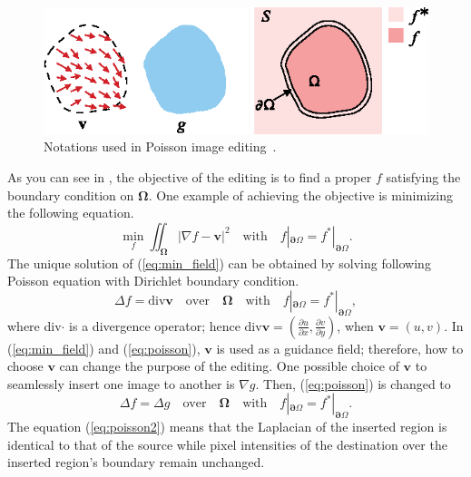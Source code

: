 \documentclass[11pt]{hyu_thesis}
\begin{document}
\begin{figure}
	\centering
	\includegraphics[width=0.9\linewidth]{poisson_image_editing_notation.eps}
	\caption{Notations used in Poisson image editing~\cite{Perez2003}.}
	\label{fig:poisson_notation}
\end{figure}
As you can see in , the objective of the editing is to find a proper $f$ satisfying the boundary condition on $\boldsymbol\Omega$. One example of achieving the objective is minimizing the following equation.
\begin{equation}
\label{eq:min_field}
\min_f \iint_{\boldsymbol\Omega} |\nabla f - \textbf{v}|^2 \quad \textrm{with} \quad f|_{\boldsymbol\partial\Omega}=f^{*}|_{\boldsymbol\partial\Omega}.
\end{equation}
The unique solution of (\ref{eq:min_field}) can be obtained by solving following Poisson equation with Dirichlet boundary condition.
\begin{equation}
\label{eq:poisson}
\Delta f = \textrm{div}\textbf{v} \quad \textrm{over} \quad \boldsymbol\Omega \quad \textrm{with} \quad f|_{\boldsymbol\partial\Omega}=f^{*}|_{\boldsymbol\partial\Omega},
\end{equation}
where div$\cdot$ is a divergence operator; hence $\textrm{div}\textbf{v}= \left( \frac{\partial u}{\partial x},\frac{\partial v}{\partial y} \right)$, when $\textbf{v}=(u, v)$. In (\ref{eq:min_field}) and (\ref{eq:poisson}), $\textbf{v}$ is used as a guidance field; therefore, how to choose $\textbf{v}$ can change the purpose of the editing. One possible choice of $\textbf{v}$ to seamlessly insert one image to another is $\nabla g$. Then, (\ref{eq:poisson}) is changed to
\begin{equation}
\label{eq:poisson2}
\Delta f = \Delta g \quad \textrm{over} \quad \boldsymbol\Omega \quad \textrm{with} \quad f|_{\boldsymbol\partial\Omega}=f^{*}|_{\boldsymbol\partial\Omega}.
\end{equation}
The equation (\ref{eq:poisson2}) means that the Laplacian of the inserted region is identical to that of the source while pixel intensities of the destination over the inserted region's boundary remain unchanged.
\end{document}
